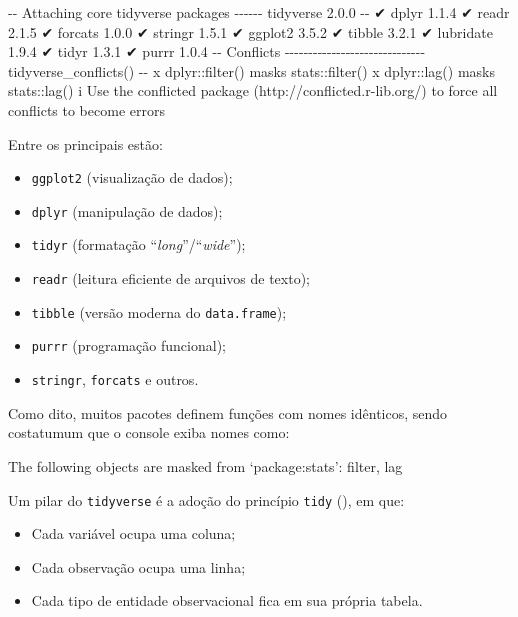 \documentclass[
  12pt,
  letterpaper,
  DIV=11,
  numbers=noendperiod]{scrreprt}
\newenvironment{Shaded}{\begin{snugshade}}{\end{snugshade}}
\newcommand{\NormalTok}[1]{\textcolor[rgb]{0.00,0.23,0.31}{#1}}
\providecommand{\tightlist}{%
  \setlength{\itemsep}{0pt}\setlength{\parskip}{0pt}}\usepackage{longtable,booktabs,array}
\theoremstyle{definition}
\theoremstyle{exemplo}
\begin{document}
\begin{Shaded}
\begin{Highlighting}[]
\NormalTok{{-}{-} Attaching core tidyverse packages {-}{-}{-}{-}{-}{-} tidyverse 2.0.0 {-}{-}}
\NormalTok{✔ dplyr     1.1.4     ✔ readr     2.1.5}
\NormalTok{✔ forcats   1.0.0     ✔ stringr   1.5.1}
\NormalTok{✔ ggplot2   3.5.2     ✔ tibble    3.2.1}
\NormalTok{✔ lubridate 1.9.4     ✔ tidyr     1.3.1}
\NormalTok{✔ purrr     1.0.4     }
\NormalTok{{-}{-} Conflicts {-}{-}{-}{-}{-}{-}{-}{-}{-}{-}{-}{-}{-}{-}{-}{-}{-}{-}{-}{-}{-}{-}{-}{-}{-}{-}{-}{-}{-}{-} tidyverse\_conflicts() {-}{-}}
\NormalTok{x dplyr::filter() masks stats::filter()}
\NormalTok{x dplyr::lag()    masks stats::lag()}
\NormalTok{i Use the conflicted package (http://conflicted.r{-}lib.org/) }
\NormalTok{  to force all conflicts to become errors}
\end{Highlighting}
\end{Shaded}

\noindent Entre os principais estão:

\begin{itemize}
\tightlist
\item
  \texttt{ggplot2} (visualização de dados);
\item
  \texttt{dplyr} (manipulação de dados);
\item
  \texttt{tidyr} (formatação ``\emph{long}''/``\emph{wide}'');
\item
  \texttt{readr} (leitura eficiente de arquivos de texto);
\item
  \texttt{tibble} (versão moderna do \texttt{data.frame});
\item
  \texttt{purrr} (programação funcional);
\item
  \texttt{stringr}, \texttt{forcats} e outros.
\end{itemize}

Como dito, muitos pacotes definem funções com nomes idênticos, sendo
costatumum que o console exiba nomes como:

\begin{Shaded}
\begin{Highlighting}[]
\NormalTok{The following objects are masked from ‘package:stats’:}
\NormalTok{    filter, lag}
\end{Highlighting}
\end{Shaded}

Um pilar do \texttt{tidyverse} é a adoção do princípio \texttt{tidy}
(), em que:

\begin{itemize}
\tightlist
\item
  Cada variável ocupa uma coluna;
\item
  Cada observação ocupa uma linha;
\item
  Cada tipo de entidade observacional fica em sua própria tabela.
\end{itemize}
\end{document}
